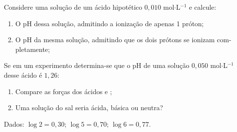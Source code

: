 Considere uma solução de um ácido hipotético  $0,010$ mol$\cdot$L$^{-1}$ e calcule:

\begin{enumerate}[label = (\alph*)]
	\item O pH dessa solução, admitindo a ionização de apenas 1 próton;
	\item O pH da mesma solução, admitindo que os dois prótons se ionizam com-
pletamente;
\end{enumerate}

Se em um experimento determina-se que o pH de uma solução $0,050$ mol$\cdot$L$^{-1}$ desse ácido é $1,26$:

\begin{enumerate}[resume*]
	\item Compare as forças dos ácidos  e ;
	\item Uma solução do sal  seria ácida, básica ou neutra?
\end{enumerate}

Dados: $\log 2 = 0,30$; $\log 5 = 0,70$; $\log 6 = 0,77$.
